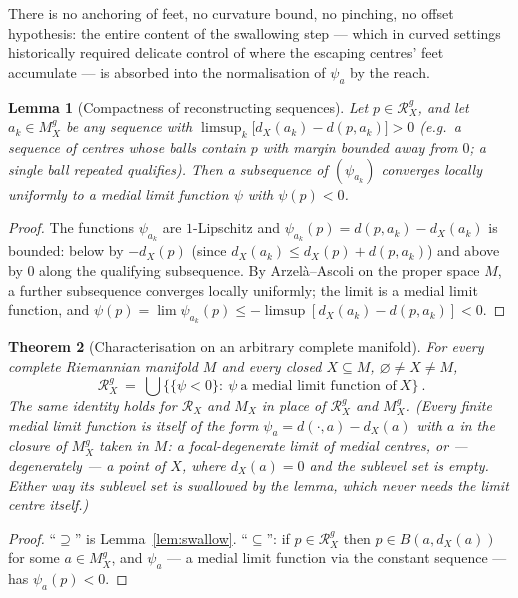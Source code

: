 \documentclass[11pt]{article}
\newtheorem{theorem}{Theorem}[section]
\newtheorem{lemma}[theorem]{Lemma}
\theoremstyle{remark}
\newcommand{\X}{X}
\newcommand{\Mx}{M_{\X}}
\newcommand{\Mg}{M^{g}_{\X}}
\newcommand{\Rx}{\mathcal{R}_{\X}}
\newcommand{\Rg}{\mathcal{R}^{g}_{\X}}
\newcommand{\dX}{d_{\X}}
\begin{document}
There is no anchoring of feet, no curvature bound, no pinching, no
offset hypothesis: the entire content of the swallowing step ---
which in curved settings historically required delicate control of
where the escaping centres' feet accumulate --- is absorbed into the
normalisation of $\psi_{a}$ by the reach.

\begin{lemma}[Compactness of reconstructing sequences]\label{lem:cpt}
Let $p\in\Rg$, and let $a_{k}\in\Mg$ be any sequence with
$\limsup_{k}\bigl[\dX(a_{k})-d(p,a_{k})\bigr]>0$ (e.g.\ a sequence of
centres whose balls contain $p$ with margin bounded away from $0$; a
single ball repeated qualifies). Then a subsequence of
$(\psi_{a_{k}})$ converges locally uniformly to a medial limit
function $\psi$ with $\psi(p)<0$.
\end{lemma}

\begin{proof}
The functions $\psi_{a_{k}}$ are $1$-Lipschitz and
$\psi_{a_{k}}(p)=d(p,a_{k})-\dX(a_{k})$ is bounded: below by
$-\dX(p)$ (since $\dX(a_{k})\le\dX(p)+d(p,a_{k})$) and above by $0$
along the qualifying subsequence. By Arzel\`a--Ascoli on the proper
space $M$, a further subsequence converges locally uniformly; the
limit is a medial limit function, and
$\psi(p)=\lim\psi_{a_{k}}(p)\le-\limsup[\dX(a_{k})-d(p,a_{k})]<0$.
\end{proof}

\begin{theorem}[Characterisation on an arbitrary complete manifold]
\label{thm:char}
For every complete Riemannian manifold $M$ and every closed
$\X\subseteq M$, $\varnothing\neq\X\neq M$,
\[
  \boxed{\ \Rg\ =\ \bigcup\bigl\{\{\psi<0\}:\ \psi\ \text{a medial
  limit function of}\ \X\bigr\}\ }.
\]
The same identity holds for $\Rx$ and $\Mx$ in place of $\Rg$ and
$\Mg$. (Every finite medial limit function is itself of the form
$\psi_{a}=d(\cdot,a)-\dX(a)$ with $a$ in the closure of $\Mg$ taken
in $M$: a focal-degenerate limit of medial centres, or ---
degenerately --- a point of $\X$, where $\dX(a)=0$ and the sublevel
set is empty. Either way its sublevel set is swallowed by the lemma,
which never needs the limit centre itself.)
\end{theorem}

\begin{proof}
``$\supseteq$'' is Lemma~\ref{lem:swallow}. ``$\subseteq$'': if
$p\in\Rg$ then $p\in B(a,\dX(a))$ for some $a\in\Mg$, and
$\psi_{a}$ --- a medial limit function via the constant sequence ---
has $\psi_{a}(p)<0$.
\end{proof}
\end{document}

